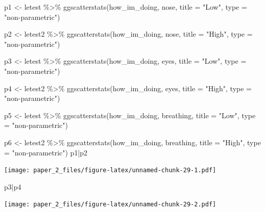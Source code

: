 \documentclass[
]{article}
\newenvironment{Shaded}{\begin{snugshade}}{\end{snugshade}}
\newcommand{\AttributeTok}[1]{\textcolor[rgb]{0.77,0.63,0.00}{#1}}
\newcommand{\FunctionTok}[1]{\textcolor[rgb]{0.00,0.00,0.00}{#1}}
\newcommand{\NormalTok}[1]{#1}
\newcommand{\OtherTok}[1]{\textcolor[rgb]{0.56,0.35,0.01}{#1}}
\newcommand{\SpecialCharTok}[1]{\textcolor[rgb]{0.00,0.00,0.00}{#1}}
\newcommand{\StringTok}[1]{\textcolor[rgb]{0.31,0.60,0.02}{#1}}
\begin{document}
\begin{Shaded}
\begin{Highlighting}[]
\NormalTok{p1 }\OtherTok{\textless{}{-}}\NormalTok{ letest }\SpecialCharTok{\%\textgreater{}\%}
  \FunctionTok{ggscatterstats}\NormalTok{(how\_im\_doing, nose, }\AttributeTok{title =} \StringTok{"Low"}\NormalTok{, }\AttributeTok{type =} \StringTok{"non{-}parametric"}\NormalTok{)}


\NormalTok{p2 }\OtherTok{\textless{}{-}}\NormalTok{ letest2 }\SpecialCharTok{\%\textgreater{}\%}
  \FunctionTok{ggscatterstats}\NormalTok{(how\_im\_doing, nose, }\AttributeTok{title =} \StringTok{"High"}\NormalTok{, }\AttributeTok{type =} \StringTok{"non{-}parametric"}\NormalTok{)}

\NormalTok{p3 }\OtherTok{\textless{}{-}}\NormalTok{ letest }\SpecialCharTok{\%\textgreater{}\%}
  \FunctionTok{ggscatterstats}\NormalTok{(how\_im\_doing, eyes, }\AttributeTok{title =} \StringTok{"Low"}\NormalTok{, }\AttributeTok{type =} \StringTok{"non{-}parametric"}\NormalTok{)}


\NormalTok{p4 }\OtherTok{\textless{}{-}}\NormalTok{ letest2 }\SpecialCharTok{\%\textgreater{}\%}
  \FunctionTok{ggscatterstats}\NormalTok{(how\_im\_doing, eyes, }\AttributeTok{title =} \StringTok{"High"}\NormalTok{, }\AttributeTok{type =} \StringTok{"non{-}parametric"}\NormalTok{)}

\NormalTok{p5 }\OtherTok{\textless{}{-}}\NormalTok{ letest }\SpecialCharTok{\%\textgreater{}\%}
  \FunctionTok{ggscatterstats}\NormalTok{(how\_im\_doing, breathing, }\AttributeTok{title =} \StringTok{"Low"}\NormalTok{, }\AttributeTok{type =} \StringTok{"non{-}parametric"}\NormalTok{)}


\NormalTok{p6 }\OtherTok{\textless{}{-}}\NormalTok{ letest2 }\SpecialCharTok{\%\textgreater{}\%}
  \FunctionTok{ggscatterstats}\NormalTok{(how\_im\_doing, breathing, }\AttributeTok{title =} \StringTok{"High"}\NormalTok{, }\AttributeTok{type =} \StringTok{"non{-}parametric"}\NormalTok{)}
\NormalTok{p1}\SpecialCharTok{|}\NormalTok{p2}
\end{Highlighting}
\end{Shaded}

\texttt{[image: paper\_2\_files/figure-latex/unnamed-chunk-29-1.pdf]}

\begin{Shaded}
\begin{Highlighting}[]
\NormalTok{p3}\SpecialCharTok{|}\NormalTok{p4}
\end{Highlighting}
\end{Shaded}

\texttt{[image: paper\_2\_files/figure-latex/unnamed-chunk-29-2.pdf]}
\end{document}
